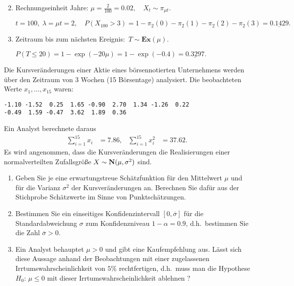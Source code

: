 \solution
\begin{enumerate}
        \setcounter{enumi}{1}
    \item Rechnungseinheit Jahre: $\mu=\frac{2}{100}=0.02, \quad X_t \sim \pi_{\mu t}.$
        
        $t=100,\;\lambda=\mu t=2, \quad P(X_{100}>3)=1-\pi_2(0)-\pi_2(1)-\pi_2(2)-\pi_2(3)=\underline{0.1429}.$

    \item Zeitraum bis zum nächsten Ereignis: $\,T \sim \mathbf{Ex}(\mu)$.

        $P(T \le 20)=1-\exp(-20 \mu)=1-\exp(-0.4)=\underline{0.3297}.$
\end{enumerate}

 Die Kursveränderungen einer Aktie eines
börsennotierten Unternehmens werden über den Zeitraum von 3 Wochen (15
Börsentage) analysiert. Die beobachteten Werte $x_{1},\dots ,x_{15}$ waren:
\begin{lstlisting}
-1.10 -1.52  0.25  1.65 -0.90  2.70  1.34 -1.26  0.22
-0.49  1.59 -0.47  3.62  1.89  0.36
\end{lstlisting}    
Ein Analyst berechnete daraus
\begin{align*}
    \sum_{i=1}^{15} x_i &= 7.86, & \sum_{i=1}^{15} x^{2}_i &= 37.62.
\end{align*}
Es wird angenommen, dass die Kursveränderungen die Realisierungen einer normalverteilten
Zufallsgröße $X\sim \mathbf N(\mu, \sigma^2)$ sind.
\begin{enumerate}
    \item Geben Sie je eine erwartungstreue Schätzfunktion für den Mittelwert $\mu$ und für
    die Varianz $\sigma^2$ der Kursveränderungen an. Berechnen Sie daf\"ur aus der Stichprobe Schätzwerte im
    Sinne von Punktsch\"atzungen.
    \item Bestimmen Sie ein einseitiges Konfidenzintervall $[0,\overline \sigma]$ f\"ur die Standardabweichung $\sigma$
    zum Konfidenzniveau $1-\alpha=0.9$, d.h.~bestimmen Sie die Zahl $\overline \sigma>0$.
    \item Ein Analyst behauptet $\mu>0$ und gibt eine Kaufempfehlung aus. Lässt
    sich diese Aussage anhand der Beobachtungen mit einer zugelassenen
    Irrtumswahrscheinlichkeit von $5\%$ rechtfertigen, d.h.~muss man die Hypothese $H_0: \, \mu \le 0$ 
    mit dieser Irrtums\-wahrscheinlichkeit   ablehnen ?
\end{enumerate}

